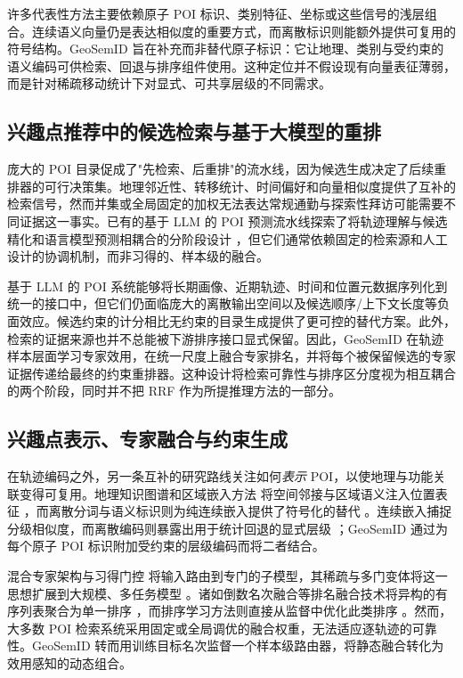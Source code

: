 \documentclass[10pt,fontset=none,twocolumn]{ctexart}
\begin{document}
许多代表性方法主要依赖原子 POI 标识、类别特征、坐标或这些信号的浅层组合。连续语义向量仍是表达相似度的重要方式，而离散标识则能额外提供可复用的符号结构。GeoSemID 旨在补充而非替代原子标识：它让地理、类别与受约束的语义编码可供检索、回退与排序组件使用。这种定位并不假设现有向量表征薄弱，而是针对稀疏移动统计下对显式、可共享层级的不同需求。

\subsection{兴趣点推荐中的候选检索与基于大模型的重排}
\label{subsec:rw_retrieval_ranking}

庞大的 POI 目录促成了"先检索、后重排"的流水线，因为候选生成决定了后续重排器的可行决策集。地理邻近性、转移统计、时间偏好和向量相似度提供了互补的检索信号，然而并集或全局固定的加权无法表达常规通勤与探索性拜访可能需要不同证据这一事实。已有的基于 LLM 的 POI 预测流水线探索了将轨迹理解与候选精化和语言模型预测相耦合的分阶段设计 \cite{zhong2025,li2024llm4poi,feng2024llmmove}，但它们通常依赖固定的检索源和人工设计的协调机制，而非习得的、样本级的融合。

基于 LLM 的 POI 系统能够将长期画像、近期轨迹、时间和位置元数据序列化到统一的接口中，但它们仍面临庞大的离散输出空间以及候选顺序/上下文长度等负面效应。候选约束的计分相比无约束的目录生成提供了更可控的替代方案。此外，检索的证据来源也并不总能被下游排序接口显式保留。因此，GeoSemID 在轨迹样本层面学习专家效用，在统一尺度上融合专家排名，并将每个被保留候选的专家证据传递给最终的约束重排器。这种设计将检索可靠性与排序区分度视为相互耦合的两个阶段，同时并不把 RRF 作为所提推理方法的一部分。

\subsection{兴趣点表示、专家融合与约束生成}
\label{subsec:rw_representation_fusion}

在轨迹编码之外，另一条互补的研究路线关注如何\emph{表示} POI，以使地理与功能关联变得可复用。地理知识图谱和区域嵌入方法 \cite{yan2017place2vec,wang2017region,yao2018zone,huang2022erniegeol} 将空间邻接与区域语义注入位置表征 \cite{mai2020space2vec}，而离散分词与语义标识则为纯连续嵌入提供了符号化的替代 \cite{tay2022dsi,rajput2023tiger,wang2022nci,oord2017vqvae}。连续嵌入捕捉分级相似度，而离散编码则暴露出用于统计回退的显式层级 \cite{hua2023index}；GeoSemID 通过为每个原子 POI 标识附加受约束的层级编码而将二者结合。

混合专家架构与习得门控 \cite{jacobs1991moe,jordan1994hme,shazeer2017moe} 将输入路由到专门的子模型，其稀疏与多门变体将这一思想扩展到大规模、多任务模型 \cite{fedus2022switch,lepikhin2021gshard,ma2018mmoe}。诸如倒数名次融合等排名融合技术将异构的有序列表聚合为单一排序 \cite{cormack2009rrf,dwork2001rank}，而排序学习方法则直接从监督中优化此类排序 \cite{liu2009ltr,burges2005ranknet,cao2007listnet}。然而，大多数 POI 检索系统采用固定或全局调优的融合权重，无法适应逐轨迹的可靠性。GeoSemID 转而用训练目标名次监督一个样本级路由器，将静态融合转化为效用感知的动态组合。
\end{document}
